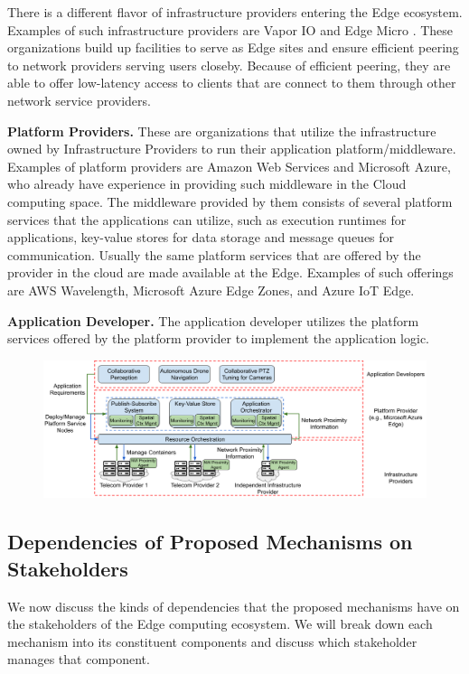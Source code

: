 \par There is a different flavor of infrastructure providers entering the Edge ecosystem. Examples of such infrastructure providers are Vapor IO \cite{vaporio} and Edge Micro \cite{edge_micro}. These organizations build up facilities to serve as Edge sites and ensure efficient peering to network providers serving users closeby. Because of efficient peering, they are able to offer low-latency access to clients that are connect to them through other network service providers.

\par \noindent \textbf{Platform Providers.} These are organizations that utilize the infrastructure owned by Infrastructure Providers to run their application platform/middleware. Examples of platform providers are Amazon Web Services and Microsoft Azure, who already have experience in providing such middleware in the Cloud computing space. The middleware provided by them consists of several platform services that the applications can utilize, such as execution runtimes for applications, key-value stores for data storage and message queues for communication. Usually the same platform services that are offered by the provider in the cloud are made available at the Edge. Examples of such offerings are AWS Wavelength, Microsoft Azure Edge Zones, and Azure IoT Edge.

\par \noindent  \textbf{Application Developer. } The application developer utilizes the platform services offered by the platform provider to implement the application logic. 

\begin{figure}
\centering
\includegraphics[width=\linewidth]{figures/misc/edge_stakeholders.png}
\caption{}
\label{fig:edge_stakeholders}
\end{figure}

\subsection{Dependencies of Proposed Mechanisms on Stakeholders}
We now discuss the kinds of dependencies that the proposed mechanisms have on the stakeholders of the Edge computing ecosystem. We will break down each mechanism into its constituent components and discuss which stakeholder manages that component.
